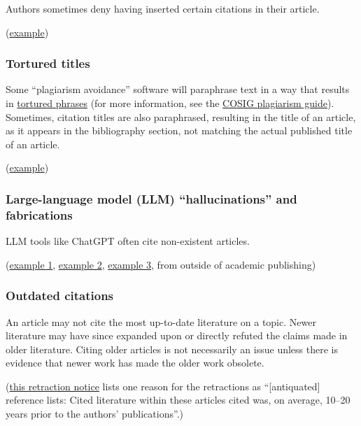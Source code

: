 \documentclass[letterpaper, 12pt]{article}
\begin{document}
Authors sometimes deny having inserted certain citations in their article.

(\href{https://pubpeer.com/publications/8DC24BCCDA68EC1954E1FCA74FDB8E\#2}{example})

\subsubsection*{Tortured titles}

Some ``plagiarism avoidance'' software will paraphrase text in a way that results in \href{https://arxiv.org/abs/2107.06751}{tortured phrases} (for more information, see the \href{https://osf.io/ntcb4}{COSIG plagiarism guide}). Sometimes, citation titles are also paraphrased, resulting in the title of an article, as it appears in the bibliography section, not matching the actual published title of an article.

(\href{https://pubpeer.com/publications/CF328DB7A6131B99F9805B49643D81\#2}{example})

\subsubsection*{Large-language model (LLM) ``hallucinations'' and fabrications}

LLM tools like ChatGPT often cite non-existent articles.

(\href{https://pubpeer.com/publications/8D6BF963665181144EC553BE2FDA92\#2}{example 1}, \href{https://pubpeer.com/publications/7F01171F32B0421DF37EE8D1B49C04#4}{example 2},
\href{https://web.archive.org/web/20230623093222/https://www.theguardian.com/technology/2023/jun/23/two-us-lawyers-fined-submitting-fake-court-citations-chatgpt}{example 3}, from outside of academic publishing)

\subsubsection*{Outdated citations}

An article may not cite the most up-to-date literature on a topic. Newer literature may have since expanded upon or directly refuted the claims made in older literature. Citing older articles is not necessarily an issue unless there is evidence that newer work has made the older work obsolete.

(\href{https://doi.org/10.1177/00315125241311636}{this retraction notice} lists one reason for the retractions as ``[antiquated] reference lists: Cited literature within these articles cited was, on average, 10–20 years prior to the authors’ publications''.)
\end{document}
